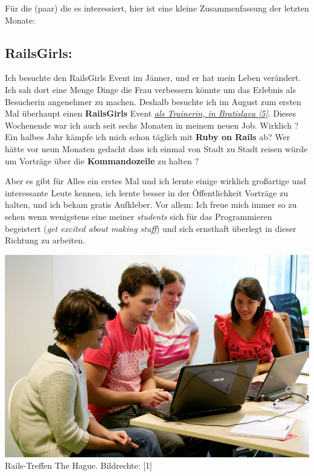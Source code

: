 Für die (paar) die es interessiert, hier ist eine kleine Zusammenfassung der letzten Monate:

\subsection*{RailsGirls:}

Ich besuchte den RailsGirls Event im Jänner, und er hat mein Leben verändert. Ich sah dort eine Menge Dinge die Frau verbessern könnte um das Erlebnis als Besucherin angenehmer zu machen. Deshalb besuchte ich im August zum ersten Mal überhaupt einen \textbf{RailsGirls} Event \href{http://railsgirls.com/bratislava}{\textit{als Trainerin, in Bratislava [5]}}. Dieses Wochenende war ich auch seit sechs Monaten in meinem neuen Job. Wirklich ? Ein halbes Jahr kämpfe ich mich schon täglich mit \textbf{Ruby on Rails} ab? Wer hätte vor neun Monaten gedacht dass ich einmal von Stadt zu Stadt reisen würde um Vorträge über die \textbf{Kommandozeile} zu halten ? 

Aber es gibt für Alles ein erstes Mal und ich lernte einige wirklich großartige und interessante Leute kennen, ich lernte besser in der Öffentlichkeit Vorträge zu halten, und ich bekam gratis Aufkleber. Vor allem: Ich freue mich immer so zu sehen wenn wenigstens eine meiner \textit{students} sich für das Programmieren begeistert (\textit{get excited about making stuff}) und sich ernsthaft überlegt in dieser Richtung zu arbeiten.   

\begin{center}
\includegraphics[width=\linewidth]{laura/floor_rg_thehague_3.jpg}
\footnotesize{Rails-Treffen The Hague. Bildrechte: [1]}
\end{center}


